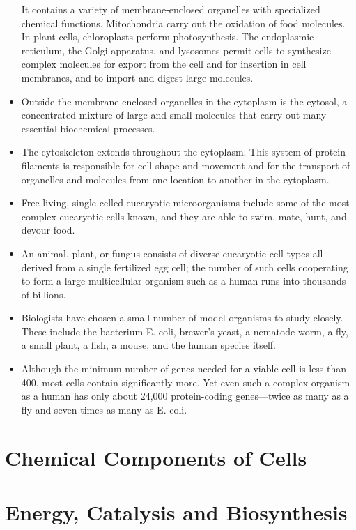 \begin{itemize}
It contains a variety of membrane-enclosed organelles with specialized chemical functions. Mitochondria carry out the oxidation of food
molecules. In plant cells, chloroplasts perform photosynthesis. The
endoplasmic reticulum, the Golgi apparatus, and lysosomes permit cells to synthesize complex molecules for export from the cell
and for insertion in cell membranes, and to import and digest large
molecules.
\item Outside the membrane-enclosed organelles in the cytoplasm is the
cytosol, a concentrated mixture of large and small molecules that
carry out many essential biochemical processes.
\item The cytoskeleton extends throughout the cytoplasm. This system of
protein filaments is responsible for cell shape and movement and
for the transport of organelles and molecules from one location to
another in the cytoplasm.
\item Free-living, single-celled eucaryotic microorganisms include some of
the most complex eucaryotic cells known, and they are able to swim,
mate, hunt, and devour food.
\item An animal, plant, or fungus consists of diverse eucaryotic cell types
all derived from a single fertilized egg cell; the number of such cells
cooperating to form a large multicellular organism such as a human
runs into thousands of billions.
\item Biologists have chosen a small number of model organisms to study
closely. These include the bacterium E. coli, brewer’s yeast, a nematode worm, a fly, a small plant, a fish, a mouse, and the human
species itself.
\item Although the minimum number of genes needed for a viable cell is
less than 400, most cells contain significantly more. Yet even such a
complex organism as a human has only about 24,000 protein-coding
genes—twice as many as a fly and seven times as many as E. coli.
\end{itemize}

\chapter{Chemical Components of Cells}






















\chapter{Energy, Catalysis and Biosynthesis}